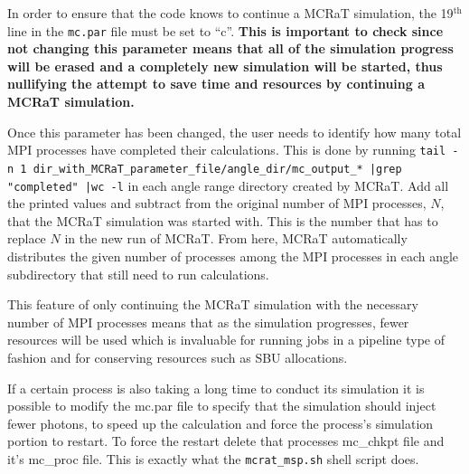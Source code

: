 \documentclass[12pt,a4paper]{article}
\begin{document}
 In order to ensure that the code knows to continue a MCRaT simulation, the 19$^\textrm{th}$ line in the \texttt{mc.par} file must be set to ``c''. {\bf This is important to check since not changing this parameter means that all of the simulation progress will be erased and a completely new simulation will be started, thus nullifying the attempt to save time and resources by continuing a MCRaT simulation.} 
 
 Once this parameter has been changed, the user needs to identify how many total MPI processes have completed their calculations. This is done by running \texttt{tail -n 1 dir\_with\_MCRaT\_parameter\_file/angle\_dir/mc\_output\_* |grep "completed" |wc -l} in each angle range directory created by MCRaT. Add all the printed values and subtract from the original number of MPI processes, $N$, that the MCRaT simulation was started with. This is the number that has to replace $N$ in the new run of MCRaT. From here, MCRaT automatically distributes the given number of processes among the MPI processes in each angle subdirectory that still need to run calculations.
 
 This feature of only continuing the MCRaT simulation with the necessary number of MPI processes means that as the simulation progresses, fewer resources will be used which is invaluable for running jobs in a pipeline type of fashion and for conserving resources such as SBU allocations.
 
 If a certain process is also taking a long time to conduct its simulation it is possible to modify the mc.par file to specify that the simulation should inject fewer photons, to speed up the calculation and force the process's simulation portion to restart. To force the restart delete that processes mc\_chkpt file and it's  mc\_proc file. This is exactly what the \texttt{mcrat\_msp.sh} shell script does. 
 
\end{document}
